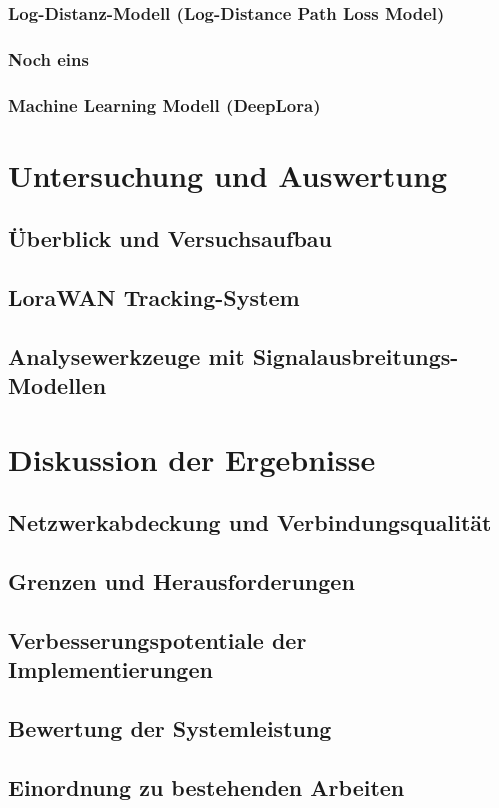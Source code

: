 \documentclass[
	a4paper,
	12pt,
	bibtotoc,
	listof=totoc,
	titlepage
]{scrartcl}
\begin{document}
\subsubsection*{Log-Distanz-Modell (Log-Distance Path Loss Model)}
\subsubsection*{Noch eins}
\subsubsection*{Machine Learning Modell (DeepLora)}

\section{Untersuchung und Auswertung}
\subsection{Überblick und Versuchsaufbau}
\subsection{LoraWAN Tracking-System}
\subsection{Analysewerkzeuge mit Signalausbreitungs-Modellen}

\section{Diskussion der Ergebnisse}
\subsection{Netzwerkabdeckung und Verbindungsqualität}
\subsection{Grenzen und Herausforderungen}
\subsection{Verbesserungspotentiale der Implementierungen}
\subsection{Bewertung der Systemleistung}
\subsection{Einordnung zu bestehenden Arbeiten}
\end{document}
